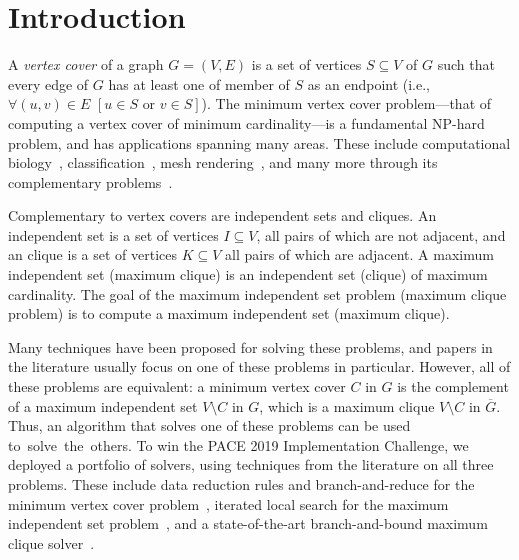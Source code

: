 \documentclass[twoside,leqno,twocolumn]{article}
\begin{document}
\section{Introduction}

A \emph{vertex cover} of a graph $G=(V,E)$ is a set of vertices $S\subseteq V$ of $G$ such that every edge of $G$ has at least one of member of $S$ as an endpoint (i.e., $\forall (u,v) \in E\,\, [u\in S \textrm{ or } v \in S]$).
The minimum vertex cover problem---that of computing a vertex cover of minimum cardinality---is a fundamental NP-hard problem, and has applications spanning many areas. These include computational biology~\cite{cheng2008prediction}, classification~\cite{gottlieb2014efficient}, mesh rendering~\cite{sander2008efficient}, and many more through its complementary problems~\cite{gnntbdmlisaac13,gardiner-docking-2000,harary-clique-1957,zaki-ecommerce-97}.

Complementary to vertex covers are independent sets and cliques. An independent set is a set of vertices $I\subseteq V$, all pairs of which are not adjacent, and an clique is a set of vertices $K\subseteq V$ all pairs of which are adjacent. A maximum independent set (maximum clique) is an independent set (clique) of maximum cardinality. The goal of the maximum independent set problem (maximum clique problem) is to compute a maximum independent set (maximum clique).

Many techniques have been proposed for solving these problems, and papers in the literature usually focus on one of these problems in particular. However, all of these problems are equivalent: a
minimum vertex cover $C$ in $G$ is the complement of a maximum independent set $V\setminus C$ in $G$, which is a maximum clique $V\setminus C$ in $\overline{G}$. Thus, an algorithm that solves one of these problems can be used to~solve~the~others.
%
To win the PACE 2019 Implementation Challenge, we deployed a portfolio of solvers, using techniques from the literature on all three problems. These include data reduction rules and branch-and-reduce for the minimum vertex cover problem~\cite{akiba-tcs-2016}, iterated local search for the maximum independent set problem~\cite{andrade-2012}, and a state-of-the-art branch-and-bound maximum clique solver~\cite{DBLP:journals/cor/LiJM17}.
\end{document}
